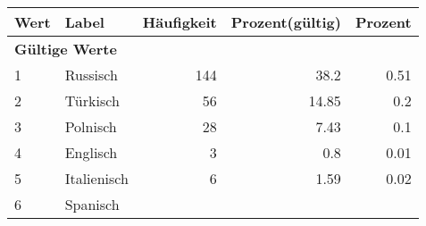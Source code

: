      \begin{longtable}{lXrrr}
     \toprule
     \textbf{Wert} & \textbf{Label} & \textbf{Häufigkeit} & \textbf{Prozent(gültig)} & \textbf{Prozent} \\
     \endhead
     \midrule
     \multicolumn{5}{l}{\textbf{Gültige Werte}}\\

     1 &
     \multicolumn{1}{X}{ Russisch   } &


       \num{144} &
       \num[round-mode=places,round-precision=2]{38.2} &
         \num[round-mode=places,round-precision=2]{0.51} \\

     2 &
     \multicolumn{1}{X}{ Türkisch   } &


       \num{56} &
       \num[round-mode=places,round-precision=2]{14.85} &
         \num[round-mode=places,round-precision=2]{0.2} \\

     3 &
     \multicolumn{1}{X}{ Polnisch   } &


       \num{28} &
       \num[round-mode=places,round-precision=2]{7.43} &
         \num[round-mode=places,round-precision=2]{0.1} \\

     4 &
     \multicolumn{1}{X}{ Englisch   } &


       \num{3} &
       \num[round-mode=places,round-precision=2]{0.8} &
         \num[round-mode=places,round-precision=2]{0.01} \\

     5 &
     \multicolumn{1}{X}{ Italienisch   } &


       \num{6} &
       \num[round-mode=places,round-precision=2]{1.59} &
         \num[round-mode=places,round-precision=2]{0.02} \\

     6 &
     \multicolumn{1}{X}{ Spanisch   } &



\end{longtable}
